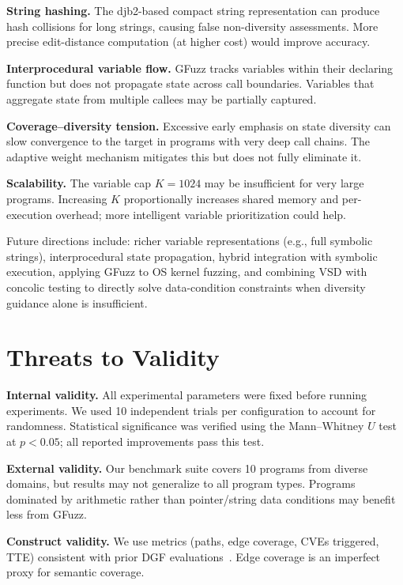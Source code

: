\documentclass[preprint,12pt,3p]{elsarticle}
\begin{document}
\textbf{String hashing.}  The djb2-based compact string representation can
produce hash collisions for long strings, causing false non-diversity
assessments.  More precise edit-distance computation (at higher cost) would
improve accuracy.

\textbf{Interprocedural variable flow.}  GFuzz tracks variables within their
declaring function but does not propagate state across call boundaries.
Variables that aggregate state from multiple callees may be partially captured.

\textbf{Coverage--diversity tension.}  Excessive early emphasis on state
diversity can slow convergence to the target in programs with very deep call
chains.  The adaptive weight mechanism mitigates this but does not fully
eliminate it.

\textbf{Scalability.}  The variable cap $K = 1024$ may be insufficient for
very large programs.  Increasing $K$ proportionally increases shared memory
and per-execution overhead; more intelligent variable prioritization could
help.

Future directions include: richer variable representations (e.g., full symbolic
strings), interprocedural state propagation, hybrid integration with symbolic
execution, applying GFuzz to OS kernel fuzzing, and combining VSD with
concolic testing to directly solve data-condition constraints when diversity
guidance alone is insufficient.

\section{Threats to Validity}
\label{sec:threats}

\textbf{Internal validity.}  All experimental parameters were fixed before
running experiments.  We used 10 independent trials per configuration to
account for randomness.  Statistical significance was verified using the
Mann--Whitney $U$ test at $p < 0.05$; all reported improvements pass this
test.

\textbf{External validity.}  Our benchmark suite covers 10 programs from
diverse domains, but results may not generalize to all program types.
Programs dominated by arithmetic rather than pointer/string data conditions
may benefit less from GFuzz.

\textbf{Construct validity.}  We use metrics (paths, edge coverage, CVEs
triggered, TTE) consistent with prior DGF evaluations~\cite{bohme2017directed,
kim2023dafl,luo2023selectfuzz}.  Edge coverage is an imperfect proxy for
semantic coverage.
\end{document}
